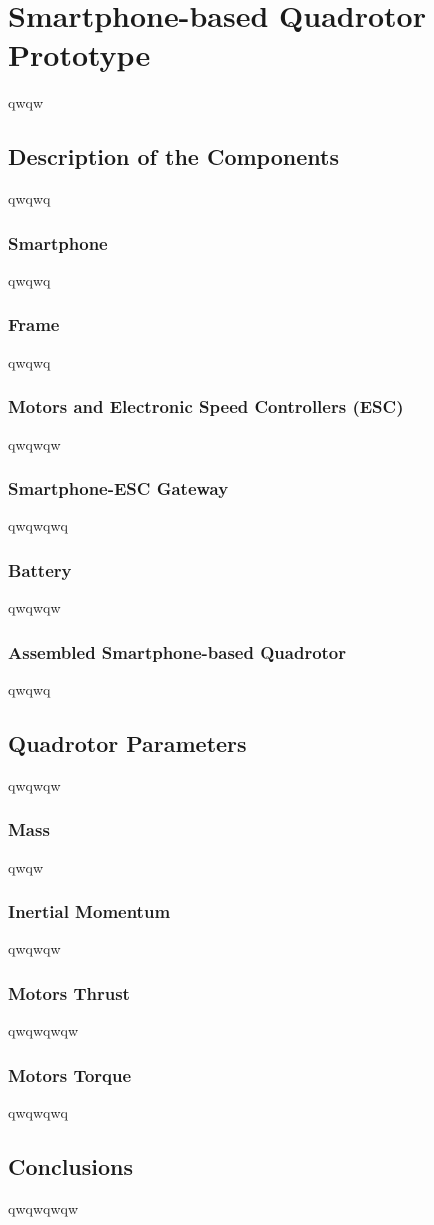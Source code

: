 \chapter{Smartphone-based Quadrotor Prototype} \label{ch:prototype}
qwqw

\section{Description of the Components}
qwqwq

\subsection{Smartphone}
qwqwq

\subsection{Frame}
qwqwq
\subsection{Motors and Electronic Speed Controllers (ESC)}
qwqwqw

\subsection{Smartphone-ESC Gateway}
qwqwqwq

\subsection{Battery}
qwqwqw

\subsection{Assembled Smartphone-based Quadrotor}
qwqwq
\section{Quadrotor Parameters}
qwqwqw
\subsection{Mass}
qwqw

\subsection{Inertial Momentum}
qwqwqw

\subsection{Motors Thrust}
qwqwqwqw

\subsection{Motors Torque}
qwqwqwq

\section{Conclusions}
qwqwqwqw